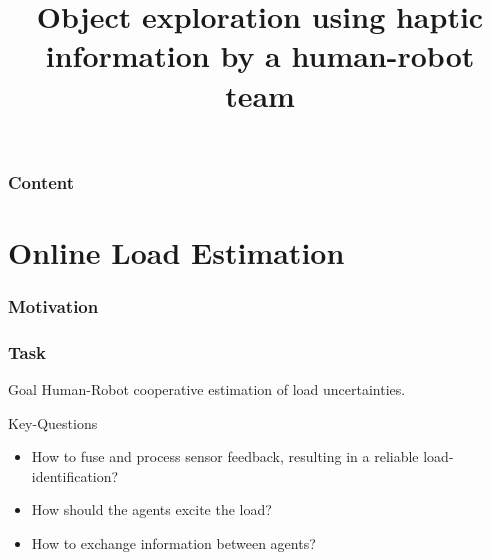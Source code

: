 \documentclass[student,noshadow]{ITRslides}
\title{Object exploration using haptic information by a human-robot team}
\begin{document}
\begin{frame}
    \titlepage
\end{frame}

\begin{frame}
	\frametitle{Content}
	\tableofcontents
\end{frame}

\section{Online Load Estimation}
\begin{frame}
	\frametitle{Motivation}
\end{frame}

\begin{frame}
	\frametitle{Task}
	\begin{block}{Goal}
			Human-Robot cooperative estimation of load uncertainties.
	\end{block}
	\vspace{2mm}
	\begin{block}{Key-Questions}
			\begin{itemize}
				\item How to fuse and process sensor feedback, resulting in a reliable load-identification?
				\item How should the agents excite the load?
				\item How to exchange information between agents?
			\end{itemize}	   
	\end{block}	
\end{frame}
\end{document}
